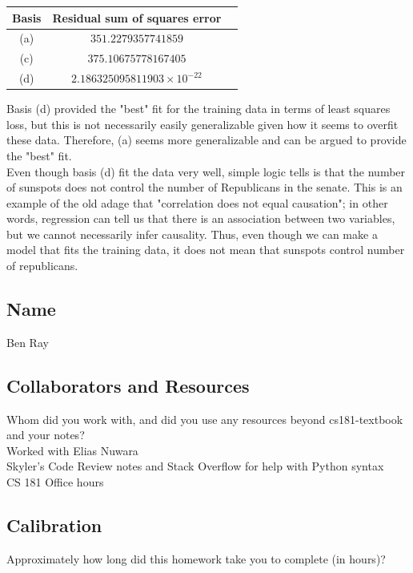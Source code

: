 \documentclass[submit]{harvardml}
\begin{document}
\smallskip
\begin{center}
\begin{tabular}{ |c|c|c| } 
 \hline
 Basis & Residual sum of squares error \\ 
 \hline\hline
 (a) & $351.2279357741859$ \\
 \hline
 (c) & $375.10675778167405$ \\ 
 \hline
 (d) & $2.186325095811903 \times 10^{-22}$ \\ 
 \hline
\end{tabular}
\end{center}

\smallskip
\noindent Basis (d) provided the "best" fit for the training data in terms of least squares loss, but this is not necessarily easily generalizable given how it seems to overfit these data. Therefore, (a) seems more generalizable and can be argued to provide the "best" fit.\\

\noindent Even though basis (d) fit the data very well, simple logic tells is that the number of sunspots does not control the number of Republicans in the senate. This is an example of the old adage that "correlation does not equal causation"; in other words, regression can tell us that there is an association between two variables, but we cannot necessarily infer causality. Thus, even though we can make a model that fits the training data, it does not mean that sunspots control number of republicans.

\newpage
\subsection*{Name}
Ben Ray

\subsection*{Collaborators and Resources}
Whom did you work with, and did you use any resources beyond cs181-textbook and your notes?\\
\smallskip
Worked with Elias Nuwara\\
Skyler's Code Review notes and Stack Overflow for help with Python syntax\\
CS 181 Office hours

\subsection*{Calibration}
Approximately how long did this homework take you to complete (in hours)?\\
\end{document}
